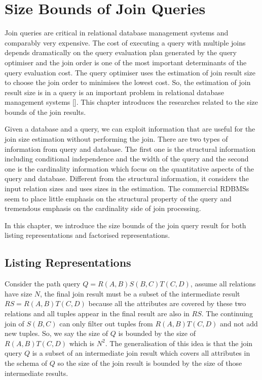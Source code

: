 \chapter{Size Bounds of Join Queries}

Join queries are critical in relational database management systems and comparably very expensive. The cost of executing a query with multiple joins depends dramatically on the query evaluation plan generated by the query optimiser and the join order is one of the most important determinants of the query evaluation cost. The query optimiser uses the estimation of join result size to choose the join order to minimises the lowest cost. So, the estimation of join result size is in a query is an important problem in relational database management systems []. This chapter introduces the researches related to the size bounds of the join results. 

Given a database and a query, we can exploit information that are useful for the join size estimation without performing the join. There are two types of information from query and database. The first one is the structural information including conditional independence and the width of the query and the second one is the cardinality information which focus on the quantitative aspects of the query and database. Different from the structural information, it considers the input relation sizes and uses sizes in the estimation. The commercial RDBMSs seem to place little emphasis on the structural property of the query and tremendous emphasis on the cardinality side of join processing. 

In this chapter, we introduce the size bounds of the join query result for both listing representations and factorised representations. 


\section{Listing Representations}

Consider the path query $Q = R(A,B)S(B,C)T(C,D)$, assume all relations have size $N$, the final join result must be a subset of the intermediate result $RS = R(A,B)T(C,D)$ because all the attributes are covered by these two relations and all tuples appear in the final result are also in $RS$. The continuing join of $S(B,C)$ can only filter out tuples from $R(A,B)T(C,D)$ and not add new tuples. So, we say the size of $Q$ is bounded by the size of $R(A,B)T(C,D)$ which is $N^2$. The generalisation of this idea is that the join query $Q$ is a subset of an intermediate join result which covers all attributes in the schema of $Q$ so the size of the join result is bounded by the size of those intermediate results. 

